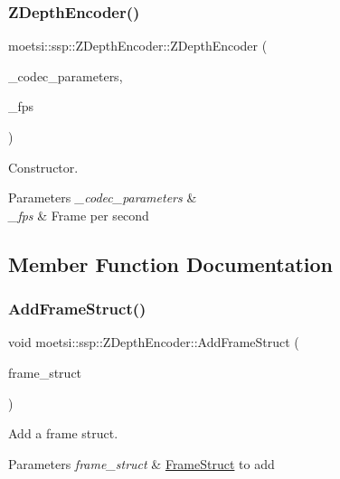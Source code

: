 \subsubsection{\texorpdfstring{Z\+Depth\+Encoder()}{ZDepthEncoder()}}
{\footnotesize\ttfamily moetsi\+::ssp\+::\+Z\+Depth\+Encoder\+::\+Z\+Depth\+Encoder (\begin{DoxyParamCaption}\item[{Y\+A\+M\+L\+::\+Node \&}]{\+\_\+codec\+\_\+parameters,  }\item[{int}]{\+\_\+fps }\end{DoxyParamCaption})}



Constructor. 


\begin{DoxyParams}{Parameters}
{\em \+\_\+codec\+\_\+parameters} & \\
\hline
{\em \+\_\+fps} & Frame per second \\
\hline
\end{DoxyParams}


\subsection{Member Function Documentation}
\mbox{\label{classmoetsi_1_1ssp_1_1ZDepthEncoder_a382e94eab7789cb4437b9711e5292343}} 
\subsubsection{\texorpdfstring{Add\+Frame\+Struct()}{AddFrameStruct()}}
{\footnotesize\ttfamily void moetsi\+::ssp\+::\+Z\+Depth\+Encoder\+::\+Add\+Frame\+Struct (\begin{DoxyParamCaption}\item[{std\+::shared\+\_\+ptr$<$ \hyperlink{structmoetsi_1_1ssp_1_1FrameStruct}{Frame\+Struct} $>$ \&}]{frame\+\_\+struct }\end{DoxyParamCaption})\hspace{0.3cm}{\ttfamily [virtual]}}



Add a frame struct. 


\begin{DoxyParams}{Parameters}
{\em frame\+\_\+struct} & \hyperlink{structmoetsi_1_1ssp_1_1FrameStruct}{Frame\+Struct} to add \\
\hline
\end{DoxyParams}


